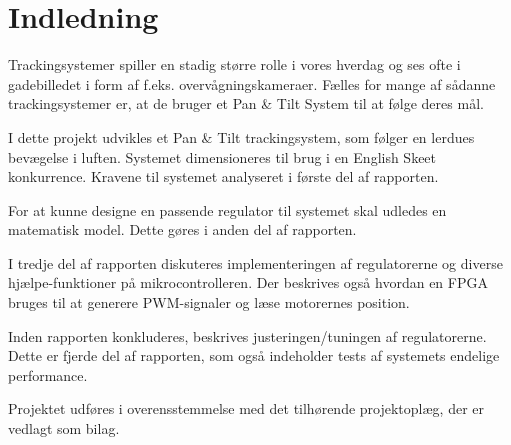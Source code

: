 \section*{Indledning}
Trackingsystemer spiller en stadig større rolle i vores hverdag og ses ofte i gadebilledet i form 
af f.eks. overvågningskameraer.
Fælles for mange af sådanne trackingsystemer er, at de bruger et Pan \& Tilt System til at følge deres mål. 

I dette projekt udvikles et Pan \& Tilt trackingsystem, som følger en lerdues bevægelse i 
luften. Systemet dimensioneres til brug i en English Skeet konkurrence. Kravene til systemet analyseret i første del af rapporten. 

For at kunne designe en passende regulator til systemet skal udledes en matematisk model. Dette gøres i anden del af rapporten. 

I tredje del af rapporten diskuteres implementeringen af regulatorerne og diverse hjælpe-funktioner på mikrocontrolleren. Der beskrives også hvordan en FPGA bruges til at generere PWM-signaler og læse motorernes position. 

Inden rapporten konkluderes, beskrives justeringen/tuningen af regulatorerne. Dette er fjerde del af rapporten, som også indeholder tests af systemets endelige performance. 

Projektet udføres i overensstemmelse med det tilhørende projektoplæg, der er vedlagt 
som bilag.
